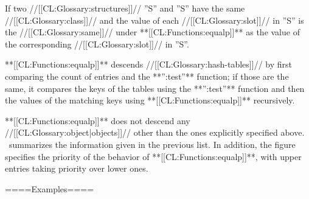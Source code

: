 If two //[[CL:Glossary:structures]]// ''S'' and ''S'' have the same //[[CL:Glossary:class]]// and the value of each //[[CL:Glossary:slot]]// in ''S'' is the //[[CL:Glossary:same]]// under **[[CL:Functions:equalp]]** as the value of the corresponding //[[CL:Glossary:slot]]// in ''S''.


**[[CL:Functions:equalp]]** descends //[[CL:Glossary:hash-tables]]// by first comparing the count of entries and the **'':test''** function; if those are the same, it compares the keys of the tables using the **'':test''** function and then the values of the matching keys using **[[CL:Functions:equalp]]** recursively.

\endlist

**[[CL:Functions:equalp]]** does not descend any //[[CL:Glossary:object|objects]]// other than the ones explicitly specified above. \Thenextfigure\ summarizes the information given in the previous list. In addition, the figure specifies the priority of the behavior of **[[CL:Functions:equalp]]**, with upper entries taking priority over lower ones.


====Examples====

